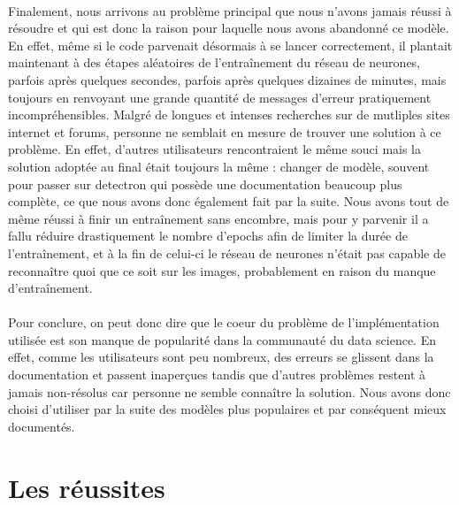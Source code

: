 \paragraph{} Finalement, nous arrivons au problème principal que nous n'avons jamais réussi à résoudre et qui est donc la raison pour laquelle nous avons abandonné ce modèle. En effet, même si le code parvenait désormais à se lancer correctement, il plantait maintenant à des étapes aléatoires de l'entraînement du réseau de neurones, parfois après quelques secondes, parfois après quelques dizaines de minutes, mais toujours en renvoyant une grande quantité de messages d'erreur pratiquement incompréhensibles. Malgré de longues et intenses recherches sur de mutliples sites internet et forums, personne ne semblait en mesure de trouver une solution à ce problème. En effet, d'autres utilisateurs rencontraient le même souci mais la solution adoptée au final était toujours la même : changer de modèle, souvent pour passer sur detectron qui possède une documentation beaucoup plus complète, ce que nous avons donc également fait par la suite. Nous avons tout de même réussi à finir un entraînement sans encombre, mais pour y parvenir il a fallu réduire drastiquement le nombre d'epochs afin de limiter la durée de l'entraînement, et à la fin de celui-ci le réseau de neurones n'était pas capable de reconnaître quoi que ce soit sur les images, probablement en raison du manque d'entraînement.

\paragraph{} Pour conclure, on peut donc dire que le coeur du problème de l'implémentation utilisée est son manque de popularité dans la communauté du data science. En effet, comme les utilisateurs sont peu nombreux, des erreurs se glissent dans la documentation et passent inaperçues tandis que d'autres problèmes restent à jamais non-résolus car personne ne semble connaître la solution. Nous avons donc choisi d'utiliser par la suite des modèles plus populaires et par conséquent mieux documentés. 

\section{Les réussites}


